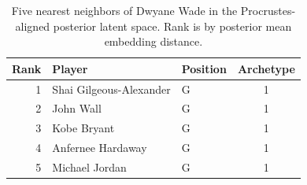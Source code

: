 \begin{table}[htbp]
  \centering\small
  \begin{tabular}{rllc}
    \toprule
    Rank & Player & Position & Archetype \\
    \midrule
    1 & Shai Gilgeous-Alexander & G & 1 \\
    2 & John Wall & G & 1 \\
    3 & Kobe Bryant & G & 1 \\
    4 & Anfernee Hardaway & G & 1 \\
    5 & Michael Jordan & G & 1 \\
    \bottomrule
  \end{tabular}
  \caption{Five nearest neighbors of Dwyane Wade in the Procrustes-aligned posterior latent space. Rank is by posterior mean embedding distance.}
  \label{tab:Dwyane_Wade_neighbors}
\end{table}

